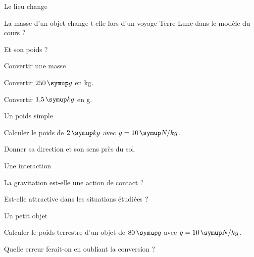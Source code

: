 \par\noindent\begin{minipage}{\linewidth}
\begin{exercice}[1]{Le lieu change}
\begin{questions}
\item La masse d’un objet change-t-elle lors d’un voyage Terre-Lune dans le modèle du cours ?
\item Et son poids ?
\end{questions}
\end{exercice}
\end{minipage}
\par\noindent\begin{minipage}{\linewidth}
\begin{exercice}[1]{Convertir une masse}
\begin{questions}
\item Convertir $250\unite g$ en kg.
\item Convertir $1{,}5\unite{kg}$ en g.
\end{questions}
\end{exercice}
\end{minipage}
\par\noindent\begin{minipage}{\linewidth}
\begin{exercice}[1]{Un poids simple}
\begin{questions}
\item Calculer le poids de $2\unite{kg}$ avec $g=10\unite{N/kg}$.
\item Donner sa direction et son sens près du sol.
\end{questions}
\end{exercice}
\end{minipage}
\par\noindent\begin{minipage}{\linewidth}
\begin{exercice}[1]{Une interaction}
\begin{questions}
\item La gravitation est-elle une action de contact ?
\item Est-elle attractive dans les situations étudiées ?
\end{questions}
\end{exercice}
\end{minipage}
\clearpage{}
\par\noindent\begin{minipage}{\linewidth}
\begin{exercice}[2]{Un petit objet}
\begin{questions}
\item Calculer le poids terrestre d’un objet de $80\unite g$ avec $g=10\unite{N/kg}$.
\item Quelle erreur ferait-on en oubliant la conversion ?
\end{questions}
\end{exercice}
\end{minipage}
